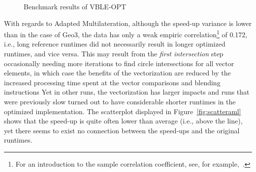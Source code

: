 \begin{figure}
\begin{center}
\end{center}
\caption{Benchmark results of VBLE-OPT}
\label{fig:vblescatterplots}
\end{figure}

With regards to Adapted Multilateration, although the speed-up variance is lower than in the case of Geo3, the data has only a weak empiric correlation\footnote{For an introduction to the sample correlation coefficient, see, for example,~\cite[p. 33ff]{ross2004statistics}.} of 0.172, i.e., long reference runtimes did not necessarily result in longer optimized runtimes, and vice versa. This may result from the \emph{first intersection} step occasionally needing more iterations to find circle intersections for all vector elements, in which case the benefits of the vectorization are reduced by the increased processing time spent at the vector comparisons and blending instructions Yet in other runs, the vectorization has larger impacts and runs that were previously slow turned out to have considerable shorter runtimes in the optimized implementation. The scatterplot displayed in Figure~\ref{fig:scatteraml} shows that the speed-up is quite often lower than average (i.e., above the line), yet there seems to exist no connection between the speed-ups and the original runtimes.

